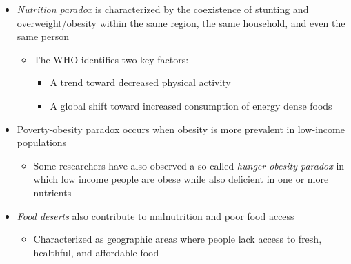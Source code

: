 \documentclass[title={Chapter 13}]{fdsn201notes}
\begin{document}
\begin{itemize}
	\item \emph{Nutrition paradox} is characterized by the coexistence of stunting and overweight/obesity within the same region, the same household, and even the same person
	\begin{itemize}
		\item The WHO identifies two key factors:
		\begin{itemize}
			\item A trend toward decreased physical activity
			\item A global shift toward increased consumption of energy dense foods
		\end{itemize}
	\end{itemize}
	\item Poverty-obesity paradox occurs when obesity is more prevalent in low-income populations
	\begin{itemize}
		\item Some researchers have also observed a so-called \emph{hunger-obesity paradox} in which low income people are obese while also deficient in one or more nutrients
	\end{itemize}
	\item \emph{Food deserts} also contribute to malnutrition and poor food access
	\begin{itemize}
		\item Characterized as geographic areas where people lack access to fresh, healthful, and affordable food
	\end{itemize}
\end{itemize}
\end{document}
